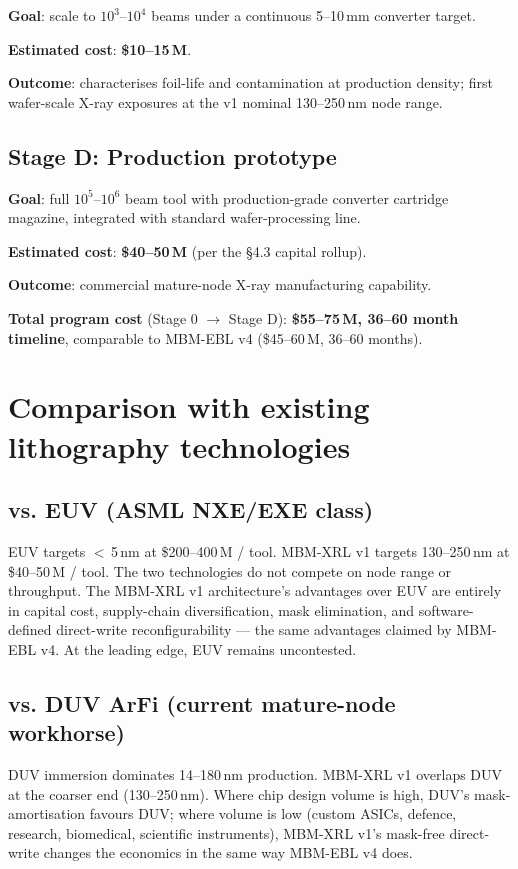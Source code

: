 \documentclass[11pt,letterpaper]{article}
\begin{document}
\textbf{Goal}: scale to $10^3$--$10^4$ beams under a continuous 5--10\,mm converter target.

\textbf{Estimated cost}: \textbf{\$10--15\,M}.

\textbf{Outcome}: characterises foil-life and contamination at production density; first wafer-scale X-ray exposures at the v1 nominal 130--250\,nm node range.

\subsection{Stage D: Production prototype}

\textbf{Goal}: full $10^5$--$10^6$ beam tool with production-grade converter cartridge magazine, integrated with standard wafer-processing line.

\textbf{Estimated cost}: \textbf{\$40--50\,M} (per the \S 4.3 capital rollup).

\textbf{Outcome}: commercial mature-node X-ray manufacturing capability.

\textbf{Total program cost} (Stage 0 $\to$ Stage D): \textbf{\$55--75\,M, 36--60 month timeline}, comparable to MBM-EBL v4 (\$45--60\,M, 36--60 months).

\section{Comparison with existing lithography technologies}

\subsection{vs. EUV (ASML NXE/EXE class)}

EUV targets $<$\,5\,nm at \$200--400\,M / tool. MBM-XRL v1 targets 130--250\,nm at \$40--50\,M / tool. The two technologies do not compete on node range or throughput. The MBM-XRL v1 architecture's advantages over EUV are entirely in capital cost, supply-chain diversification, mask elimination, and software-defined direct-write reconfigurability --- the same advantages claimed by MBM-EBL v4. At the leading edge, EUV remains uncontested.

\subsection{vs. DUV ArFi (current mature-node workhorse)}

DUV immersion dominates 14--180\,nm production. MBM-XRL v1 overlaps DUV at the coarser end (130--250\,nm). Where chip design volume is high, DUV's mask-amortisation favours DUV; where volume is low (custom ASICs, defence, research, biomedical, scientific instruments), MBM-XRL v1's mask-free direct-write changes the economics in the same way MBM-EBL v4 does.
\end{document}
